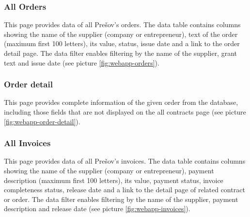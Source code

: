 \documentclass[thesis=B,english]{FITthesis}[2012/06/26]
\begin{document}
\subsubsection{All Orders}
	This page provides data of all Prešov's orders. The data table contains columns showing the name of the  supplier (company or entrepreneur), text of the order (maximum first 100 letters), its value, status, issue date and a link to the order detail page. The data filter enables filtering by the name of the supplier, grant text and issue date (see picture \ref{fig:webapp-orders}).


\subsubsection{Order detail}
	This page provides complete information of the given order from the database, including those fields that are not displayed on the all contracts page (see picture \ref{fig:webapp-order-detail}).


\subsubsection{All Invoices}
	This page provides data of all Prešov's invoices. The data table contains columns showing the name of the  supplier (company or entrepreneur), payment description (maximum first 100 letters), its value, payment status, invoice completeness status, release date and a link to the detail page of related contract or order. The data filter enables filtering by the name of the supplier, payment description and release date (see picture \ref{fig:webapp-invoices}).
\end{document}
